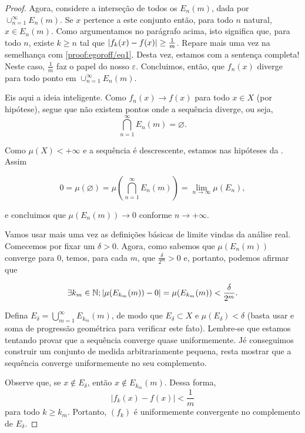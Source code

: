 \begin{proof}
    Agora, considere a interseção de todos os $E_n(m)$, dada por $\cup_{n=1}^{\infty} E_n(m)$. Se $x$ pertence a este conjunto então, para todo $n$ natural, $x\in E_n(m)$. Como argumentamos no parágrafo acima, isto significa que, para todo $n$, existe $k\geq n$ tal que $\left| f_k(x) - f(x) \right| \geq \frac{1}{m}$. Repare mais uma vez na semelhança com \eqref{proof:egoroff/eq1}. Desta vez, estamos com a sentença completa! Neste caso, $\frac{1}{m}$ faz o papel do nosso $\varepsilon$. Concluimos, então, que $f_n(x)$ diverge para todo ponto em $\cup_{n=1}^{\infty} E_n(m)$.

    Eis aqui a ideia inteligente. Como $f_n(x) \to f(x)$ para todo $x \in X$ (por hipótese), segue que não existem pontos onde a sequência diverge, ou seja,
    \begin{equation*}
        \bigcap_{n=1}^{\infty} E_n(m) = \varnothing.
    \end{equation*}

    Como $\mu(X) < +\infty$ e a sequência é descrescente, estamos nas hipóteses da . Assim
    
    \begin{equation*}
        0=\mu(\varnothing)=\mu\left(\bigcap_{n=1}^{\infty} E_n(m)\right) = \lim_{n\rightarrow \infty} \mu (E_n),
    \end{equation*}
    
    e concluimos que $\mu(E_n(m)) \to 0$ conforme $n \to +\infty$.
    
    Vamos usar mais uma vez as definições básicas de limite vindas da análise real. Comecemos por fixar um $\delta >0$. Agora, como sabemos que $\mu(E_n(m))$ converge para $0$, temos, para cada $m$, que $\frac{\delta}{2^m}>0$ e, portanto, podemos afirmar que
    
    \begin{equation*}
        \exists k_m \in \mathbb{N} ; \left| \mu(E_{k_m}(m))-0 \right|=\mu(E_{k_m}(m)) < \frac{\delta}{2^m}.
    \end{equation*}
    
    Defina $E_\delta = \bigcup_{m=1}^{\infty} E_{k_m}(m)$, de modo que $E_\delta \subset X$ e $\mu(E_\delta) < \delta$ (basta usar  e soma de progressão geométrica para verificar este fato). Lembre-se que estamos tentando provar que a sequência converge quase uniformemente. Jé conseguimos construir um conjunto de medida arbitrariamente pequena, resta mostrar que a sequência converge uniformemente no seu complemento.
    
    Observe que, se $x \notin E_\delta$, então $x \notin E_{k_m}(m)$. Dessa forma, 
    \begin{equation*}
        |f_k(x) - f(x)| < \frac{1}{m}
    \end{equation*}
    para todo $k \geq k_m$. Portanto, $(f_k)$ é uniformemente convergente no complemento de $E_\delta$.
\end{proof}
